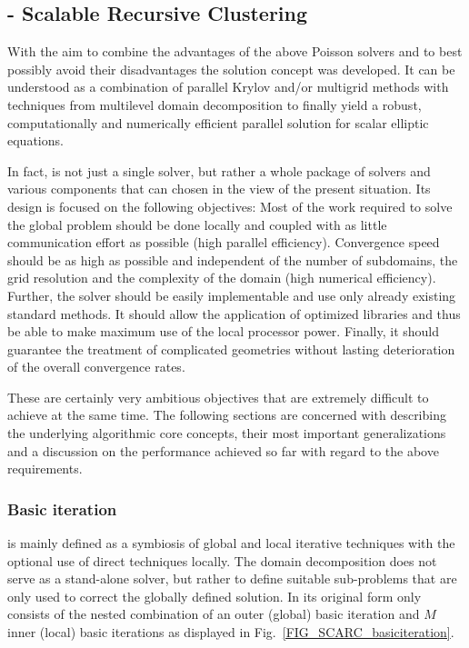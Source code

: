 \subsection{\scarc{} - Scalable Recursive Clustering} 
\label{SEC_SCARC_scarc}
  
With the aim to combine the advantages of the above Poisson solvers and to best possibly avoid their disadvantages the solution concept \scarc{} was developed. It can be understood as a combination of parallel Krylov and/or multigrid methods with techniques from multilevel domain decomposition to finally yield a robust, computationally and numerically efficient parallel solution for scalar elliptic equations. 

In fact, \scarc{} is not just a single solver, but rather a whole package of solvers and various components that can chosen in the view of the present situation. Its
design is focused on the following objectives: Most of the work required to solve the global problem should be done locally and coupled with as little communication effort as possible (high parallel efficiency). Convergence speed should be as high as possible and independent of the number of subdomains, the grid resolution and the complexity of the domain (high numerical efficiency). Further, the solver should be easily implementable and use only already existing standard methods. It should allow the application of optimized libraries and thus be able to make maximum use of the local processor power. Finally, it should guarantee the treatment of complicated geometries without lasting deterioration of the overall convergence rates. 

These are certainly very ambitious objectives that are extremely difficult to achieve at the same time. 
The following sections are concerned with describing the underlying algorithmic core concepts, their most important generalizations and a discussion on the performance achieved so far with regard to the above requirements.


\subsubsection{Basic \scarc{} iteration}
\scarc{} is mainly defined as a symbiosis of global and local iterative techniques with the optional use of direct techniques locally. 
The domain decomposition does not serve as a stand-alone solver, but rather to define suitable sub-problems that are only used to correct the globally defined solution.
%
In its original form \scarc{} only consists of the
nested combination of an outer (global) basic iteration and $M$ inner (local) basic iterations as displayed in Fig.~\ref{FIG_SCARC_basiciteration}. 

